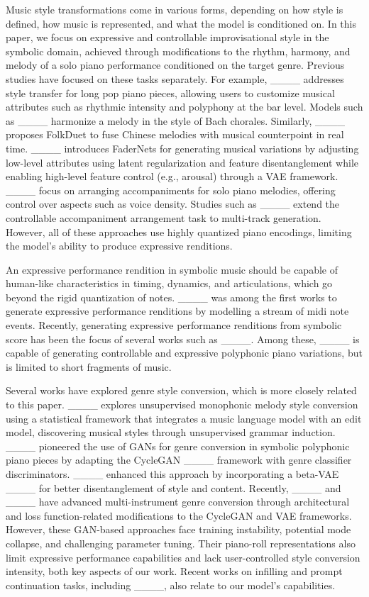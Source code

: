 Music style transformations come in various forms, depending on how style is defined, how music is represented, and what the model is conditioned on. In this paper, we focus on expressive and controllable improvisational style in the symbolic domain, achieved through modifications to the rhythm, harmony, and melody of a solo piano performance conditioned on the target genre. Previous studies have focused on these tasks separately. For example, ____ addresses style transfer for long pop piano pieces, allowing users to customize musical attributes such as rhythmic intensity and polyphony at the bar level. Models such as ____ harmonize a melody in the style of Bach chorales. Similarly, ____ proposes FolkDuet to fuse Chinese melodies with musical counterpoint in real time. ____ introduces FaderNets for generating musical variations by adjusting low-level attributes using latent regularization and feature disentanglement while enabling high-level feature control (e.g., arousal) through a VAE framework. ____ focus on arranging accompaniments for solo piano melodies, offering control over aspects such as voice density. Studies such as ____ extend the controllable accompaniment arrangement task to multi-track generation. However, all of these approaches use highly quantized piano encodings, limiting the model's ability to produce expressive renditions.

An expressive performance rendition in symbolic music should be capable of human-like characteristics in timing, dynamics, and articulations, which go beyond the rigid quantization of notes. ____ was among the first works to generate expressive performance renditions by modelling a stream of midi note events. Recently, generating expressive performance renditions from symbolic score has been the focus of several works such as ____. Among these, ____ is capable of generating controllable and expressive polyphonic piano variations, but is limited to short fragments of music. 

Several works have explored genre style conversion, which is more closely related to this paper. ____ explores unsupervised monophonic melody style conversion using a statistical framework that integrates a music language model with an edit model, discovering musical styles through unsupervised grammar induction. ____ pioneered the use of GANs for genre conversion in symbolic polyphonic piano pieces by adapting the CycleGAN ____ framework with genre classifier discriminators. ____ enhanced this approach by incorporating a beta-VAE ____ for better disentanglement of style and content. Recently, ____ and ____ have advanced multi-instrument genre conversion through architectural and loss function-related modifications to the CycleGAN and VAE frameworks. However, these GAN-based approaches face training instability, potential mode collapse, and challenging parameter tuning. Their piano-roll representations also limit expressive performance capabilities and lack user-controlled style conversion intensity, both key aspects of our work. Recent works on infilling and prompt continuation tasks, including ____, also relate to our model's capabilities.